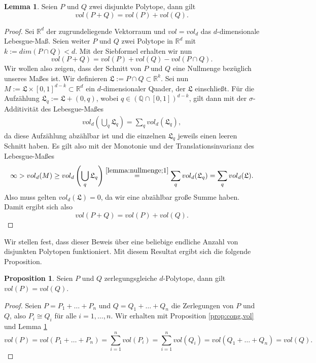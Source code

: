 \documentclass[11pt,titlepage]{article}
\newcommand{\setQ}{\mathbb{Q}}
\newcommand{\setR}{\mathbb{R}}
\theoremstyle{definition}
\newtheorem{proposition}[theorem]{Proposition}
\newtheorem{lemma}[theorem]{Lemma}
\theoremstyle{remark}
\begin{document}
	\begin{lemma}\label{lemma:nullmenge}
		Seien $P$ und $Q$ zwei disjunkte Polytope, dann gilt
		\[ vol(P+Q)=vol(P)+vol(Q).\]
	\end{lemma}

	\begin{proof}
		Sei $\setR^d$ der zugrundeliegende Vektorraum und $vol=vol_d$ das $d$-dimensionale 
		Lebesgue-Maß. Seien weiter $P$ und $Q$ zwei Polytope in $\setR^d$ 
		mit $k:=dim(P\cap Q)<d$. Mit der Siebformel erhalten wir nun
		\[vol(P+Q)=vol(P)+vol(Q)-vol(P\cap Q).\]
		Wir wollen also zeigen, dass der Schnitt von $P$ und $Q$ eine Nullmenge bezüglich unseres Maßes ist. 
		Wir definieren $\mathfrak{L}:=P\cap Q \subset \setR^k$. Sei nun  $M:=\mathfrak{L}\times[0,1]^{d-k}\subset\setR^d$ ein $d$-dimensionaler Quader, der 
		$\mathfrak{L}$ einschließt. Für die Aufzählung $\mathfrak{L}_q:=\mathfrak{L}+(0,q)$, wobei $q\in(\setQ\cap[0,1])^{d-k}$, gilt dann mit der $\sigma$-Additivität des Lebesgue-Maßes
		\begin{align}
			vol_d \left(\bigcup_q\mathfrak{L}_q\right)=\sum_q vol_d(\mathfrak{L}_q), \label{lemma:nullmenge;1}
		\end{align}
		da diese Aufzählung abzählbar ist und die einzelnen $\mathfrak{L}_q$ jeweils einen leeren Schnitt haben. Es gilt also mit der Monotonie und der Translationsinvarianz des Lebesgue-Maßes
		\[\infty>vol_d(M)\geq vol_d\left(\bigcup_q \mathfrak{L}_q\right)\overset{\ref{lemma:nullmenge;1}}{=}\sum_q vol_d(\mathfrak{L}_q)=\sum_q vol_d(\mathfrak{L}).\]
		Also muss gelten $vol_d(\mathfrak{L})=0$, da wir eine abzählbar große Summe haben. 
		Damit ergibt sich also
		\[vol(P+Q)=vol(P)+vol(Q).\]
	\end{proof}

	Wir stellen fest, dass dieser Beweis über eine beliebige endliche Anzahl von disjunkten 
	Polytopen funktioniert. Mit diesem Resultat ergibt sich die folgende Proposition.
	
	\begin{proposition} \label{prop:zerl,vol}
		Seien $P$ und $Q$ zerlegungsgleiche $d$-Polytope, dann gilt $vol(P)=vol(Q)$.
	\end{proposition}
	
	\begin{proof}
		Seien $P=P_1+\ldots+P_n$ und $Q=Q_1+\ldots+Q_n$ die Zerlegungen von $P$ und 
		$Q$, also $P_i\cong Q_i$ für alle $i=1,\ldots,n$. Wir erhalten mit Proposition \ref{prop:cong,vol} und Lemma \ref{lemma:nullmenge} 
		\[vol(P)=vol(P_1+\ldots+P_n)=\sum_{i=1}^n vol(P_i)=\sum_{i=1}^n vol(Q_i)=vol(Q_1+\ldots+Q_n)=vol(Q).\]
	\end{proof}
\end{document}
